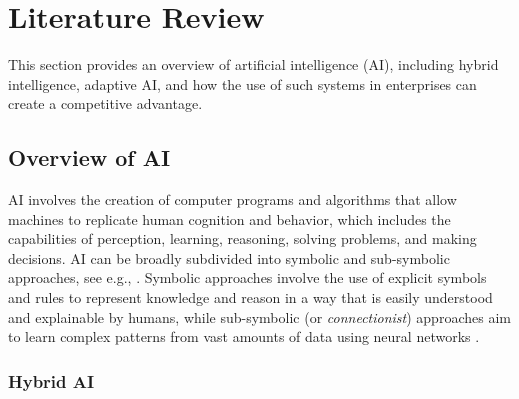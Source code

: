 \section{Literature Review}
\label{sec:literature}

This section provides an overview of artificial intelligence (AI), including hybrid intelligence, adaptive AI,
and how the use of such systems in enterprises can create a competitive advantage.

\subsection{Overview of AI}

AI involves the creation of computer programs and algorithms that allow machines to replicate human cognition and behavior,
which includes the capabilities of perception, learning, reasoning, solving problems, and making decisions. AI can be broadly
subdivided into symbolic and sub-symbolic approaches, see e.g., \cite{eliasmithSymbolicSubsymbolic2006}. Symbolic approaches
involve the use of explicit symbols and rules to represent knowledge and reason in a way that is easily understood and explainable
by humans, while sub-symbolic (or \textit{connectionist}) approaches aim to learn complex patterns from vast amounts of data
using neural networks \citep{ilkouSymbolicVsSubsymbolic2020}.

\subsubsection{Hybrid AI}

